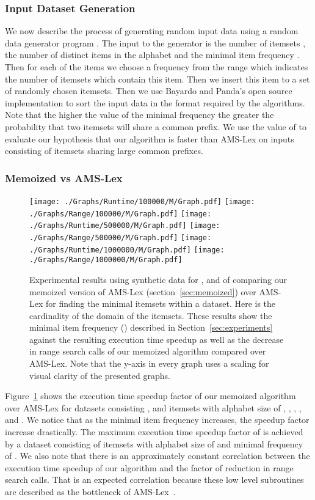 \documentclass[13pt,a4paper]{article}
\begin{document}
\subsubsection{Input Dataset Generation}
We now describe the process of generating random input data using a random data generator program . The input to the generator is the number of itemsets , the number of distinct items  in the alphabet and the minimal item frequency . Then for each of the  items we choose a frequency  from the range  which indicates the number of itemsets which contain this item. Then we insert this item to a set of randomly chosen  itemsets. Then we use Bayardo and  Panda's open source implementation to sort the input data in the format required by the algorithms. Note that the higher the value of the minimal frequency  the greater the probability that two itemsets will share a common prefix. We use the value of  to evaluate our hypothesis that our algorithm is faster than AMS-Lex on inputs consisting of itemsets sharing large common prefixes.

\subsubsection{Memoized vs AMS-Lex}
\label{sec:exp:synth:memo_AMS}

\begin{figure} [t]
	\centering
	\texttt{[image: ./Graphs/Runtime/100000/M/Graph.pdf]}
	\texttt{[image: ./Graphs/Range/100000/M/Graph.pdf]}
	\texttt{[image: ./Graphs/Runtime/500000/M/Graph.pdf]}
	\texttt{[image: ./Graphs/Range/500000/M/Graph.pdf]}
	\texttt{[image: ./Graphs/Runtime/1000000/M/Graph.pdf]}
	\texttt{[image: ./Graphs/Range/1000000/M/Graph.pdf]}
	\caption{Experimental results using synthetic data for ,  and  of comparing our memoized version of AMS-Lex (section~\ref{sec:memoized}) over AMS-Lex for finding the minimal itemsets within a dataset. Here  is the cardinality of the domain of the itemsets. These results show the minimal item frequency () described in Section~\ref{sec:experiments} against the resulting execution time speedup as well as the decrease in range search calls of our memoized algorithm compared over AMS-Lex. Note that the y-axis in every graph uses a  scaling for visual clarity of the presented graphs. }
	\label{fig:exp:memoized}
\end{figure}

Figure~\ref{fig:exp:memoized} shows the execution time speedup factor of our memoized algorithm over AMS-Lex for datasets consisting ,  and  itemsets with alphabet size of , , , ,  and . We notice that as the minimal item frequency increases, the speedup factor increase drastically. The maximum execution time speedup factor of  is achieved by a dataset consisting of  itemsets with alphabet size of  and minimal frequency of . We also note that there is an approximately constant correlation between the execution time speedup of our algorithm and the factor of reduction in range search calls. That is an expected correlation because these low level subroutines are described as the bottleneck of AMS-Lex~\cite{BayardoPanda11}. 
\end{document}
